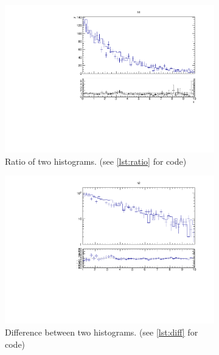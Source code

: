 \begin{figure}
  \begin{subfigure}{0.5\linewidth}
    \centering
    \includegraphics[width=1.0\linewidth]{assets/tut1.pdf}   
    \caption{Ratio of two histograms. (see \autoref{lst:ratio} for code)}
    \label{fig:ratio}
  \end{subfigure}
  \begin{subfigure}{0.5\linewidth}
    \centering
    \includegraphics[width=1.0\linewidth]{assets/diff.pdf}  
    \caption{Difference between two histograms. (see \autoref{lst:diff} for code)}
    \label{fig:diff}
  \end{subfigure}
  \begin{subfigure}{0.5\linewidth}
    \centering

\end{subfigure}
\end{figure}
